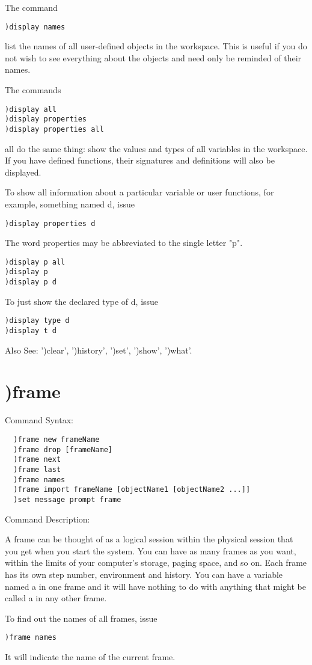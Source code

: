 The command
\begin{verbatim}
)display names
\end{verbatim}
list the names of all user-defined objects in the workspace. This is useful if you do not wish to see everything about the objects and need only be reminded of their names.

The commands
\begin{verbatim}
)display all
)display properties
)display properties all
\end{verbatim}
all do the same thing: show the values and types of all variables in the workspace. If you have defined functions, their signatures and definitions will also be displayed.

To show all information about a particular variable or user functions, for example, something named d, issue
\begin{verbatim}
)display properties d
\end{verbatim}
The word properties may be abbreviated to the single letter "p".
\begin{verbatim}
)display p all
)display p
)display p d
\end{verbatim}
To just show the declared type of d, issue
\begin{verbatim}
)display type d
)display t d
\end{verbatim}
Also See: ')clear', ')history', ')set', ')show', ')what'.

\section{)frame}

Command Syntax:
\begin{verbatim}
  )frame new frameName
  )frame drop [frameName]
  )frame next
  )frame last
  )frame names
  )frame import frameName [objectName1 [objectName2 ...]]
  )set message prompt frame
\end{verbatim}
Command Description:

A frame can be thought of as a logical session within the physical session that you get when you start the system. You can have as many frames as you want, within the limits of your computer's storage, paging space, and so on. Each frame has its own step number, environment and history. You can have a variable named a in one frame and it will have nothing to do with anything that might be called a in any other frame.

To find out the names of all frames, issue
\begin{verbatim}
)frame names
\end{verbatim}
It will indicate the name of the current frame.

